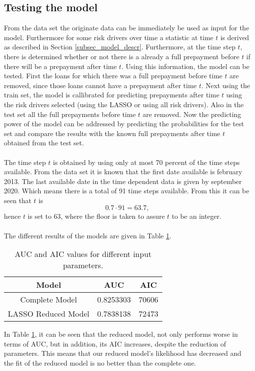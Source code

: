 \subsection{Testing the model}
    From the data set the originate data can be immediately be used 
    as input for the model. Furthermore for some risk drivers over time 
    a statistic at time $t$ is derived as described in Section 
    \ref{subsec_model_descr}. Furthermore, at the time step $t$, 
    there is determined whether or not there is a already a full prepayment 
    before $t$ if there will be a prepayment after time $t$. Using this 
    information, the model can be tested. First the loans for 
    which there was a full prepayment before time $t$ are removed, 
    since those loans cannot have a prepayment after time $t$. 
    Next using the train set, the model is callibrated for 
    predicting prepayments after time $t$ using the risk drivers 
    selected (using the LASSO or using all risk drivers). 
    Also in the test set all the full prepayments before time 
    $t$ are removed. Now the predicting power of the model 
    can be addressed by predicting the probabilities for the test set 
    and compare the results with the known full prepayments after time 
    $t$ obtained from the test set.
    \\\\
    The time step $t$ is obtained by using only at most 70 percent 
    of the time steps available. From the data set it is known that 
    the first date available is february 2013. The last available
    date in the time dependent data is given by september 2020. 
    Which means there is a total of 91 time steps available. 
    From this it can be seen that $t$ is
    \begin{equation}
        0.7 \cdot 91 = 63.7,
    \end{equation}
    hence $t$ is set to 63, where the floor is taken to assure 
    $t$ to be an integer.
    \\\\
    The different results of the models are given in Table 
    \ref{ModelAICandAUC}.
    \begin{table}[H]
        \centering
            \begin{tabular}{c|c|c}
            Model & AUC & AIC \\\hline
            Complete Model & 0.8253303 & 70606\\
            LASSO Reduced Model &  0.7838138 & 72473\\
            
            \end{tabular}
            \caption{AUC and AIC values for different input parameters.}
            \label{ModelAICandAUC}
    \end{table}    
    In Table \ref{ModelAICandAUC}, it can be seen that the 
    reduced model, not only performs worse in terms of AUC, 
    but in addition, its AIC increases, despite the reduction 
    of parameters. This means that our reduced model's 
    likelihood has decreased and the fit of the reduced model is no better 
    than the complete one.
